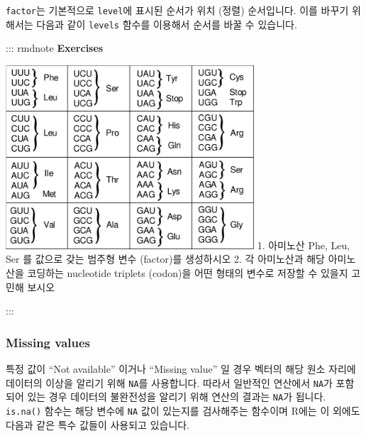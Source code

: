 \documentclass[
]{book}
\newenvironment{Shaded}{\begin{snugshade}}{\end{snugshade}}
\newcommand{\FunctionTok}[1]{\textcolor[rgb]{0.00,0.00,0.00}{#1}}
\newcommand{\NormalTok}[1]{#1}
\newcommand{\OtherTok}[1]{\textcolor[rgb]{0.56,0.35,0.01}{#1}}
\newcommand{\SpecialCharTok}[1]{\textcolor[rgb]{0.00,0.00,0.00}{#1}}
\newcommand{\StringTok}[1]{\textcolor[rgb]{0.31,0.60,0.02}{#1}}
\begin{document}
\texttt{factor}는 기본적으로 \texttt{level}에 표시된 순서가 위치 (정렬) 순서입니다. 이를 바꾸기 위해서는 다음과 같이 \texttt{levels} 함수를 이용해서 순서를 바꿀 수 있습니다.

\begin{Shaded}
\end{Shaded}

::: rmdnote
\textbf{Exercises}

\includegraphics[width=3.64583in,height=\textheight]{images/03/codon_table.png}
1. 아미노산 Phe, Leu, Ser 를 값으로 갖는 범주형 변수 (factor)를 생성하시오
2. 각 아미노산과 해당 아미노산을 코딩하는 nucleotide triplets (codon)을 어떤 형태의 변수로 저장할 수 있을지 고민해 보시오

:::

\hypertarget{missing-values}{%
\subsubsection{Missing values}\label{missing-values}}

특정 값이 ``Not available'' 이거나 ``Missing value'' 일 경우 벡터의 해당 원소 자리에 데이터의 이상을 알리기 위해 \texttt{NA}를 사용합니다. 따라서 일반적인 연산에서 \texttt{NA}가 포함되어 있는 경우 데이터의 불완전성을 알리기 위해 연산의 결과는 \texttt{NA}가 됩니다. \texttt{is.na()} 함수는 해당 변수에 \texttt{NA} 값이 있는지를 검사해주는 함수이며 R에는 이 외에도 다음과 같은 특수 값들이 사용되고 있습니다.
\end{document}

